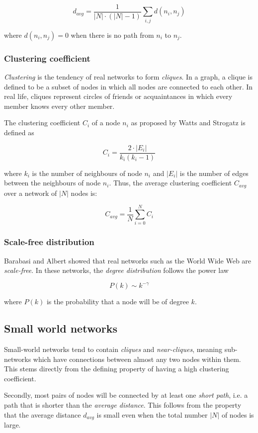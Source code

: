 \documentclass[a4paper,11pt,titlepage]{article}
\begin{document}
\[ d_{avg} = \frac{1}{|N| \cdot (|N| - 1)} \sum_{i, j} d(n_i, n_j) \]

where $d(n_i, n_j) = 0$ when there is no path from $n_i$ to $n_j$.

\subsubsection{Clustering coefficient}

\emph{Clustering} is the tendency of real networks to form
\emph{cliques}. In a graph, a clique is defined to be a subset of
nodes in which all nodes are connected to each other.
In real life, cliques represent circles of friends
or acquaintances in which every member knows every other member.

The clustering coefficient $C_i$ of a node $n_i$ as proposed by
Watts and Strogatz is defined as

\[ C_i = \frac{2 \cdot |E_i|}{k_i(k_i-1)} \]

where $k_i$ is the number of neighbours of node $n_i$ and $|E_i|$ is
the number of edges between the neighbours of node $n_i$. Thus, the
average clustering coefficient $C_{avg}$ over a network of $|N|$
nodes is:

\[ C_{avg} = \frac{1}{N}\sum_{i=0}^{N} C_i \]

\subsubsection{Scale-free distribution}
\label{sec:scale-free}

Barabasi and Albert showed that real networks such as the World Wide Web
are \emph{scale-free}. In these networks, the \emph{degree distribution}
follows the power law

\[ P(k) \sim k^{-\gamma} \]

where $P(k)$ is the probability that a node will be of degree $k$.


\subsection{Small world networks}

Small-world networks tend to contain \emph{cliques} and
\emph{near-cliques}, meaning sub-networks which have connections
between almost any two nodes within them. This stems directly from
the defining property of having a high clustering coefficient.

Secondly, most pairs of nodes will be connected by at least one
\emph{short path}, i.e. a path that is shorter than the
\emph{average distance}.
This follows from the property that the average distance $d_{avg}$
is small even when the total number $|N|$ of nodes is large.
\end{document}
